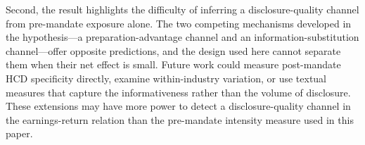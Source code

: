 \documentclass[12pt]{article}
\begin{document}
Second, the result highlights the difficulty of inferring a disclosure-quality channel from pre-mandate exposure alone. The two competing mechanisms developed in the hypothesis---a preparation-advantage channel and an information-substitution channel---offer opposite predictions, and the design used here cannot separate them when their net effect is small. Future work could measure post-mandate HCD specificity directly, examine within-industry variation, or use textual measures that capture the informativeness rather than the volume of disclosure. These extensions may have more power to detect a disclosure-quality channel in the earnings-return relation than the pre-mandate intensity measure used in this paper.




\clearpage



\clearpage
\end{document}
